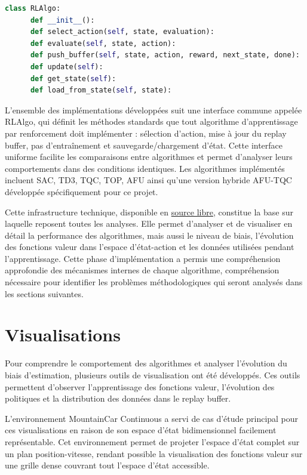 \documentclass[a4paper, 12pt]{report}
\begin{document}
  \begin{lstlisting}[language=Python]
  class RLAlgo:
      def __init__():
      def select_action(self, state, evaluation):
      def evaluate(self, state, action):
      def push_buffer(self, state, action, reward, next_state, done):
      def update(self):
      def get_state(self):
      def load_from_state(self, state):
  \end{lstlisting}

    L'ensemble des implémentations développées suit une interface commune
    appelée RLAlgo, qui définit les méthodes standards que tout algorithme
    d'apprentissage par renforcement doit implémenter : sélection d'action,
    mise à jour du replay buffer, pas d'entraînement et sauvegarde/chargement
    d'état. Cette interface uniforme facilite les comparaisons entre
    algorithmes et permet d'analyser leurs comportements dans des conditions
    identiques. Les algorithmes implémentés incluent SAC, TD3, TQC, TOP, AFU
    ainsi qu'une version hybride AFU-TQC développée spécifiquement pour ce
    projet.

    Cette infrastructure technique, disponible en
    \href{https://github.com/paulchambaz/isir-internship}{source libre},
    constitue la base sur laquelle reposent toutes les analyses. Elle permet
    d'analyser et de visualiser en détail la performance des algorithmes, mais
    aussi le niveau de biais, l'évolution des fonctions valeur dans l'espace
    d'état-action et les données utilisées pendant l'apprentissage. Cette
    phase d'implémentation a permis une compréhension approfondie des
    mécanismes internes de chaque algorithme, compréhension nécessaire pour
    identifier les problèmes méthodologiques qui seront analysés dans les
    sections suivantes.

    \section{Visualisations}

    Pour comprendre le comportement des algorithmes et analyser l'évolution du
    biais d'estimation, plusieurs outils de visualisation ont été développés.
    Ces outils permettent d'observer l'apprentissage des fonctions valeur,
    l'évolution des politiques et la distribution des données dans le replay
    buffer.

    L'environnement MountainCar Continuous a servi de cas d'étude principal
    pour ces visualisations en raison de son espace d'état bidimensionnel
    facilement représentable. Cet environnement permet de projeter l'espace
    d'état complet sur un plan position-vitesse, rendant possible la
    visualisation des fonctions valeur sur une grille dense couvrant tout
    l'espace d'état accessible.
\end{document}
